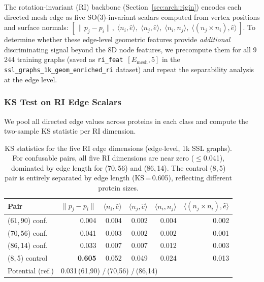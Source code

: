 The rotation-invariant (RI) backbone (Section~\ref{sec:arch:rigin}) encodes
each directed mesh edge as five SO(3)-invariant scalars computed from vertex
positions and surface normals:
$[\,\|p_j{-}p_i\|,\; \langle n_i, \hat{e}\rangle,\;
   \langle n_j, \hat{e}\rangle,\;
   \langle n_i, n_j\rangle,\;
   \langle (n_j{\times}n_i), \hat{e}\rangle\,]$.
To determine whether these edge-level geometric features provide \emph{additional}
discriminating signal beyond the 8D node features, we precompute them for all
9\,244 training graphs (saved as \texttt{ri\_feat}~$[E_\text{mesh},5]$ in the
\texttt{ssl\_graphs\_1k\_geom\_enriched\_ri} dataset) and repeat the separability
analysis at the edge level.

\subsubsection{KS Test on RI Edge Scalars}
\label{sec:analysis:ri:ks}

We pool all directed edge values across proteins in each class and compute the
two-sample KS statistic per RI dimension.

\begin{table}[ht]
  \centering
  \caption{KS statistics for the five RI edge dimensions (edge-level, 1k SSL
           graphs).
           For confusable pairs, all five RI dimensions are near zero
           ($\leq$0.041), dominated by edge length for (70,\,56) and (86,\,14).
           The control (8,\,5) pair is entirely separated by edge length
           (KS\,=\,0.605), reflecting different protein sizes.}
  \label{tab:ks_ri}
  \begin{tabular}{lrrrrr}
    \toprule
    \textbf{Pair}
      & $\|p_j{-}p_i\|$
      & $\langle n_i,\hat{e}\rangle$
      & $\langle n_j,\hat{e}\rangle$
      & $\langle n_i,n_j\rangle$
      & $\langle (n_j{\times}n_i),\hat{e}\rangle$ \\
    \midrule
    (61,\,90) conf. & 0.004 & 0.004 & 0.002 & 0.004 & 0.002 \\
    (70,\,56) conf. & 0.041 & 0.003 & 0.002 & 0.002 & 0.001 \\
    (86,\,14) conf. & 0.033 & 0.007 & 0.007 & 0.012 & 0.003 \\
    (8,\,5) control & \textbf{0.605} & 0.052 & 0.049 & 0.024 & 0.013 \\
    \midrule
    Potential (ref.) & \multicolumn{5}{l}{0.031\,(61,90) \;/\; 0.192\,(70,56) \;/\; 0.250\,(86,14)} \\
    \bottomrule
  \end{tabular}
\end{table}

